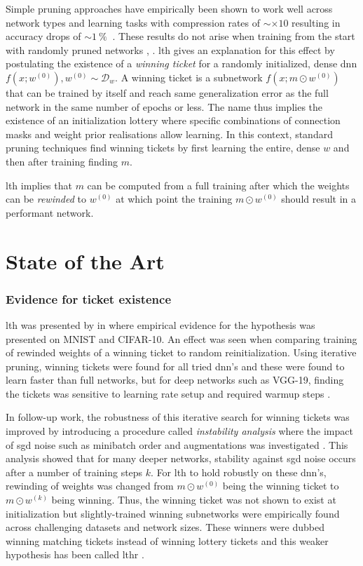 \documentclass[12pt,fleqn,twocolumn]{article}
\newcommand{\pro}{\ensuremath{\:\%{}\:}}
\begin{document}
Simple pruning approaches have empirically been shown to work well across network types and learning tasks with compression rates of $\sim \times 10$ resulting in accuracy drops of $\sim 1\pro$ \cite[Fig. 7] {bla2020state}.
These results do not arise when training from the start with randomly pruned networks \cite[Chap. 4]{li2016filt}, \cite[Chap. 3.3]{han2015learning}.
\acrshort{lth} gives an explanation for this effect by postulating the existence of a \emph{winning ticket} for a randomly initialized, dense \acrshort{dnn} $f(x;w^{(0)}), w^{(0)}\sim \mathcal D_w$.
A winning ticket is a subnetwork $f(x;m\odot w^{(0)})$ that can be trained by itself and reach same generalization error as the full network in the same number of epochs or less.
The name thus implies the existence of an initialization lottery where specific combinations of connection masks and weight prior realisations allow learning.
In this context, standard pruning techniques find winning tickets by first learning the entire, dense $w$ and then after training finding $m$.

\acrshort{lth} implies that $m$ can be computed from a full training after which the weights can be \emph{rewinded} to $w^{(0)}$ at which point the training $m \odot w^{(0)}$ should result in a performant network.

\section*{State of the Art}%
\subsubsection*{Evidence for ticket existence}
\acrshort{lth} was presented by \textcite{frankle2018the} in \citeyear{frankle2018the} where empirical evidence for the hypothesis was presented on MNIST and CIFAR-10.
An effect was seen when comparing training of rewinded weights of a winning ticket to random reinitialization.
Using iterative pruning, winning tickets were found for all tried \acrshort{dnn}'s and these were found to learn faster than full networks, but for deep networks such as VGG-19, finding the tickets was sensitive to learning rate setup and required warmup steps \cite[Chap. 4]{frankle2018the}.

In follow-up work, the robustness of this iterative search for winning tickets was improved by introducing a procedure called \emph{instability analysis} where the impact of \acrfull{sgd} noise such as minibatch order and augmentations was investigated \cite{Frankle2020LinearMC}.
This analysis showed that for many deeper networks, stability against \acrshort{sgd} noise occurs after a number of training steps $k$.
For \acrshort{lth} to hold robustly on these \acrshort{dnn}'s, rewinding of weights was changed from $m \odot w^{(0)}$ being the winning ticket to $m\odot w^{(k)}$ being winning.
Thus, the winning ticket was not shown to exist at initialization but slightly-trained winning subnetworks were empirically found across challenging datasets and network sizes.
These winners were dubbed winning matching tickets instead of winning lottery tickets and this weaker hypothesis has been called \acrfull{lthr} \cite{lange2020lth} .
\end{document}
